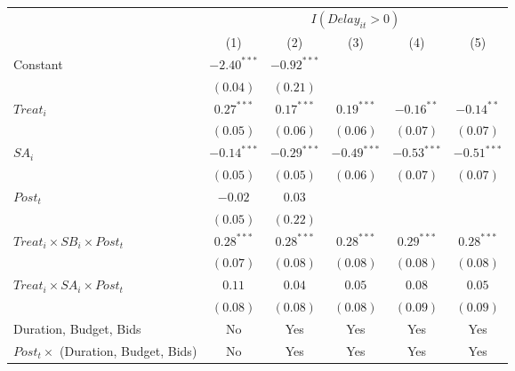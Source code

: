 \documentclass[
]{article}
\begin{document}
\begin{table}
\begin{center}
\begin{tabular}{l c c c c c}
\hline
 & \multicolumn{5}{c}{$I(Delay_{it}>0)$} \\
\cline{2-6}
 & (1) & (2) & (3) & (4) & (5) \\
\hline
Constant                                   & $-2.40^{***}$ & $-0.92^{***}$ &               &               &               \\
                                           & $(0.04)$      & $(0.21)$      &               &               &               \\
$Treat_i$                                  & $0.27^{***}$  & $0.17^{***}$  & $0.19^{***}$  & $-0.16^{**}$  & $-0.14^{**}$  \\
                                           & $(0.05)$      & $(0.06)$      & $(0.06)$      & $(0.07)$      & $(0.07)$      \\
$SA_i$                                     & $-0.14^{***}$ & $-0.29^{***}$ & $-0.49^{***}$ & $-0.53^{***}$ & $-0.51^{***}$ \\
                                           & $(0.05)$      & $(0.05)$      & $(0.06)$      & $(0.07)$      & $(0.07)$      \\
$Post_t$                                   & $-0.02$       & $0.03$        &               &               &               \\
                                           & $(0.05)$      & $(0.22)$      &               &               &               \\
$Treat_i \times SB_i \times Post_t$        & $0.28^{***}$  & $0.28^{***}$  & $0.28^{***}$  & $0.29^{***}$  & $0.28^{***}$  \\
                                           & $(0.07)$      & $(0.08)$      & $(0.08)$      & $(0.08)$      & $(0.08)$      \\
$Treat_i \times SA_i \times Post_t$        & $0.11$        & $0.04$        & $0.05$        & $0.08$        & $0.05$        \\
                                           & $(0.08)$      & $(0.08)$      & $(0.08)$      & $(0.09)$      & $(0.09)$      \\
\hline
Duration, Budget, Bids                     & No            & Yes           & Yes           & Yes           & Yes           \\
$Post_t \times $  (Duration, Budget, Bids) & No            & Yes           & Yes           & Yes           & Yes           \\

\end{tabular}
\end{center}
\end{table}
\end{document}
